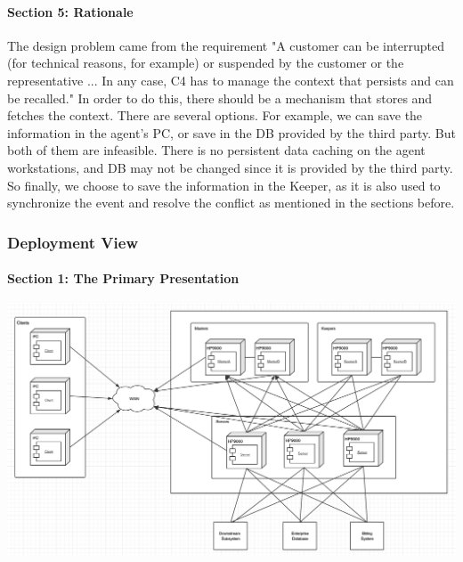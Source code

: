 \documentclass{article}
\begin{document}
			\paragraph{Section 5: Rationale}
			The design problem came from the requirement "A customer can be interrupted (for technical reasons, for example) or suspended by the customer or the representative ... In any case, C4 has to manage the context that persists and can be recalled."
			In order to do this, there should be a mechanism that stores and fetches the context. There are several options. For example, we can save the information in the agent's PC, or save in the DB provided by the third party. But both of them are infeasible. There is no persistent data caching on the agent workstations, and DB may not be changed since it is provided by the third party. So finally, we choose to save the information in the Keeper, as it is also used to synchronize the event and resolve the conflict as mentioned in the sections before.

		\subsubsection{Deployment View} 
			\paragraph{Section 1: The Primary Presentation}
			\begin{center}
			\includegraphics[scale=0.25]{deployment1.png}
			\end{center}
\end{document}
